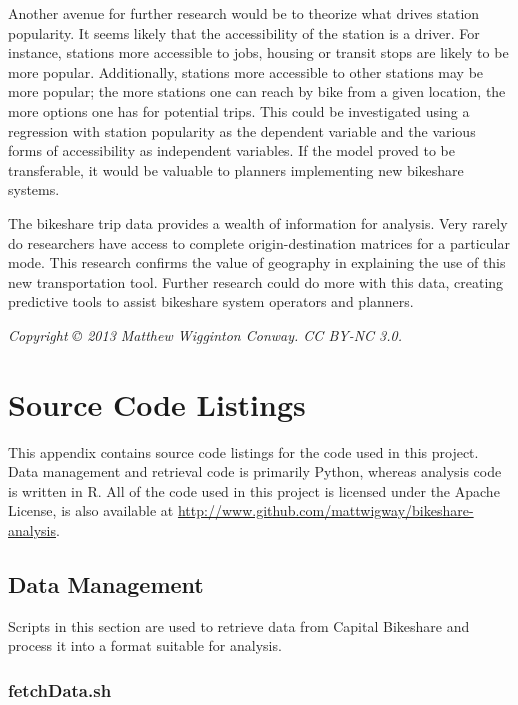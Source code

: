 \documentclass[letterpaper,11pt]{article}
\begin{document}
Another avenue for further research would be to theorize what drives
station popularity. It seems likely that the accessibility of the
station is a driver. For instance, stations more accessible to jobs,
housing or transit stops are likely to be more popular. Additionally,
stations more accessible to other stations may be more popular; the
more stations one can reach by bike from a given location, the more
options one has for potential trips. This could be investigated using
a regression with station popularity as the dependent variable and the
various forms of accessibility as independent variables. If the model
proved to be transferable, it would be valuable to planners
implementing new bikeshare systems.

The bikeshare trip data provides a wealth of information for
analysis. Very rarely do researchers have access to complete
origin-destination matrices for a particular mode. This research
confirms the value of geography in explaining the use of this new
transportation tool. Further research could do more with this data,
creating predictive tools to assist bikeshare system operators and
planners.

\clearpage\newpage
\printbibliography

\vspace{5em}

\emph{Copyright © 2013 Matthew Wigginton Conway. CC BY-NC 3.0.}

\newpage
{}
\fancyhfoffset[E,O]{0pt}
\appendix
\section{Source Code Listings}

This appendix contains source code listings for the code used in this
project. Data management and retrieval code is primarily Python,
whereas analysis code is written in R. All of the code used in this
project is licensed under the Apache License, is also available at
\url{http://www.github.com/mattwigway/bikeshare-analysis}.

\subsection{Data Management}

Scripts in this section are used to retrieve data from Capital
Bikeshare and process it into a format suitable for analysis.

\subsubsection{fetchData.sh}
\label{fetchData.sh}
\end{document}
